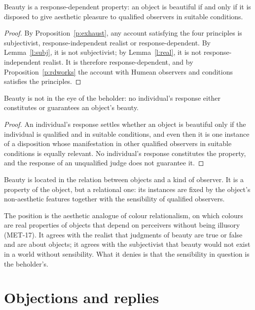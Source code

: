\documentclass{situationist-preprint}
\begin{document}
\begin{theorem}\label{t:main}
Beauty is a response-dependent property: an object is beautiful if and only if it is disposed to give aesthetic pleasure to qualified observers in suitable conditions.
\end{theorem}

\begin{proof}
By Proposition~\ref{p:exhaust}, any account satisfying the four principles is subjectivist, response-independent realist or response-dependent. By Lemma~\ref{l:subj}, it is not subjectivist; by Lemma~\ref{l:real}, it is not response-independent realist. It is therefore response-dependent, and by Proposition~\ref{p:rdworks} the account with Humean observers and conditions satisfies the principles.
\end{proof}

\begin{corollary}\label{c:beholder}
Beauty is not in the eye of the beholder: no individual's response either constitutes or guarantees an object's beauty.
\end{corollary}

\begin{proof}
An individual's response settles whether an object is beautiful only if the individual is qualified and in suitable conditions, and even then it is one instance of a disposition whose manifestation in other qualified observers in suitable conditions is equally relevant. No individual's response constitutes the property, and the response of an unqualified judge does not guarantee it.
\end{proof}

\begin{corollary}\label{c:relation}
Beauty is located in the relation between objects and a kind of observer. It is a property of the object, but a relational one: its instances are fixed by the object's non-aesthetic features together with the sensibility of qualified observers.
\end{corollary}

The position is the aesthetic analogue of colour relationalism, on which colours are real properties of objects that depend on perceivers without being illusory (MET-17). It agrees with the realist that judgments of beauty are true or false and are about objects; it agrees with the subjectivist that beauty would not exist in a world without sensibility. What it denies is that the sensibility in question is the beholder's.

\section{Objections and replies}
\end{document}
